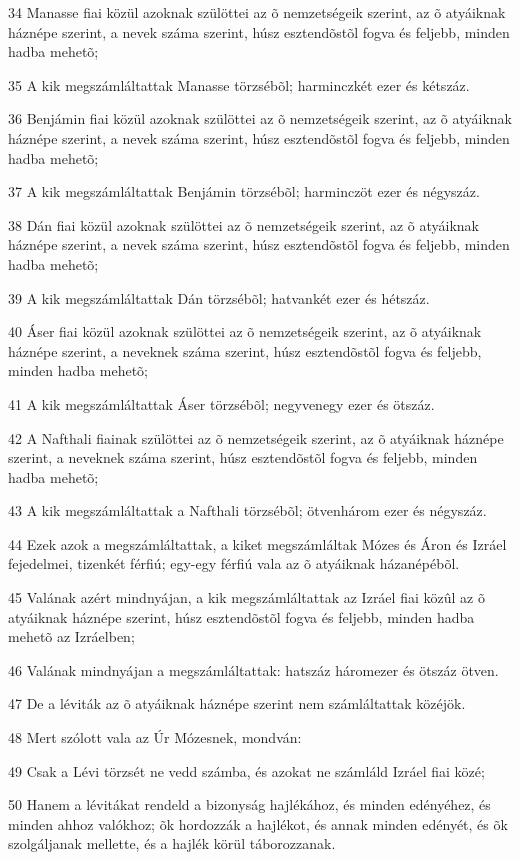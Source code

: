 \par 34 Manasse fiai közül azoknak szülöttei az õ nemzetségeik szerint, az õ atyáiknak háznépe szerint, a nevek száma szerint, húsz esztendõstõl fogva és feljebb, minden hadba mehetõ;
\par 35 A kik megszámláltattak Manasse törzsébõl; harminczkét ezer és kétszáz.
\par 36 Benjámin fiai közül azoknak szülöttei az õ nemzetségeik szerint, az õ atyáiknak háznépe szerint, a nevek száma szerint, húsz esztendõstõl fogva és feljebb, minden hadba mehetõ;
\par 37 A kik megszámláltattak Benjámin törzsébõl; harminczöt ezer és négyszáz.
\par 38 Dán fiai közül azoknak szülöttei az õ nemzetségeik szerint, az õ atyáiknak háznépe szerint, a nevek száma szerint, húsz esztendõstõl fogva és feljebb, minden hadba mehetõ;
\par 39 A kik megszámláltattak Dán törzsébõl; hatvankét ezer és hétszáz.
\par 40 Áser fiai közül azoknak szülöttei az õ nemzetségeik szerint, az õ atyáiknak háznépe szerint, a neveknek száma szerint, húsz esztendõstõl fogva és feljebb, minden hadba mehetõ;
\par 41 A kik megszámláltattak Áser törzsébõl; negyvenegy ezer és ötszáz.
\par 42 A Nafthali fiainak szülöttei az õ nemzetségeik szerint, az õ atyáiknak háznépe szerint, a neveknek száma szerint, húsz esztendõstõl fogva és feljebb, minden hadba mehetõ;
\par 43 A kik megszámláltattak a Nafthali törzsébõl; ötvenhárom ezer és négyszáz.
\par 44 Ezek azok a megszámláltattak, a kiket megszámláltak Mózes és Áron és Izráel fejedelmei, tizenkét férfiú; egy-egy férfiú vala az õ atyáiknak házanépébõl.
\par 45 Valának azért mindnyájan, a kik megszámláltattak az Izráel fiai közûl az õ atyáiknak háznépe szerint, húsz esztendõstõl fogva és feljebb, minden hadba mehetõ az Izráelben;
\par 46 Valának mindnyájan a megszámláltattak: hatszáz háromezer és ötszáz ötven.
\par 47 De a léviták az õ atyáiknak háznépe szerint nem számláltattak közéjök.
\par 48 Mert szólott vala az Úr Mózesnek, mondván:
\par 49 Csak a Lévi törzsét ne vedd számba, és azokat ne számláld Izráel fiai közé;
\par 50 Hanem a lévitákat rendeld a bizonyság hajlékához, és minden edényéhez, és minden ahhoz valókhoz; õk hordozzák a hajlékot, és annak minden edényét, és õk szolgáljanak mellette, és a hajlék körül táborozzanak.
